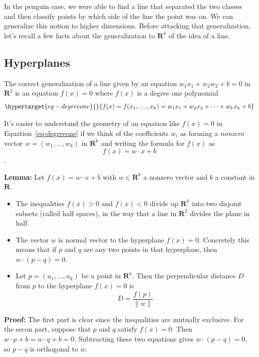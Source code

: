 \documentclass[
  11pt,
  letterpaper,
]{scrbook}
\providecommand{\tightlist}{%
  \setlength{\itemsep}{0pt}\setlength{\parskip}{0pt}}\usepackage{longtable,booktabs,array}
\theoremstyle{plain}
\theoremstyle{remark}
\begin{document}
In the penguin case, we were able to find a line that separated the two
classes and then classify points by which side of the line the point was
on. We can generalize this notion to higher dimensions. Before attacking
that generalization, let's recall a few facts about the generalization
to \(\mathbf{R}^{k}\) of the idea of a line.

\hypertarget{hyperplanes}{%
\subsection{Hyperplanes}\label{hyperplanes}}

The correct generalization of a line given by an equation
\(w_1 x_1+ w_2 w_2+b=0\) in \(\mathbf{R}^{2}\) is an equation \(f(x)=0\)
where \(f(x)\) is a degree one polynomial
\begin{equation}\protect\hypertarget{eq-degreeone}{}{
f(x) = f(x_1,\ldots, x_k) = w_1 x_1 + w_2 x_2 +\cdots + w_k x_k + b 
}\label{eq-degreeone}\end{equation}

It's easier to understand the geometry of an equation like \(f(x)=0\) in
Equation~\ref{eq-degreeone} if we think of the coefficients \(w_i\) as
forming a \emph{nonzero} vector \(w = (w_1,\ldots, w_k)\) in
\(\mathbf{R}^{k}\) and writing the formula for \(f(x)\) as \[
f(x) = w\cdot x +b
\].

\textbf{Lemma:} Let \(f(x)=w\cdot x+b\) with \(w\in\mathbf{R}^{k}\) a
nonzero vector and \(b\) a constant in \(\mathbf{R}\).

\begin{itemize}
\tightlist
\item
  The inequalities \(f(x)>0\) and \(f(x)<0\) divide up
  \(\mathbf{R}^{k}\) into two disjoint subsets (called half spaces), in
  the way that a line in \(\mathbf{R}^{2}\) divides the plane in half.
\item
  The vector \(w\) is normal vector to the hyperplane \(f(x)=0\).
  Concretely this means that if \(p\) and \(q\) are any two points in
  that hyperplane, then \(w\cdot (p-q)=0\).
\item
  Let \(p=(u_1,\ldots,u_k)\) be a point in \(\mathbf{R}^{k}\). Then the
  perpendicular distance \(D\) from \(p\) to the hyperplane \(f(x)=0\)
  is \[
  D = \frac{f(p)}{\|w\|}
  \]
\end{itemize}

\textbf{Proof:} The first part is clear since the inequalities are
mutually exclusive. For the secon part, suppose that \(p\) and \(q\)
satisfy \(f(x)=0\). Then \(w\cdot p+b = w\cdot q+b=0\). Subtracting
these two equations gives \(w\cdot (p-q)=0\), so \(p-q\) is orthogonal
to \(w\).
\end{document}
